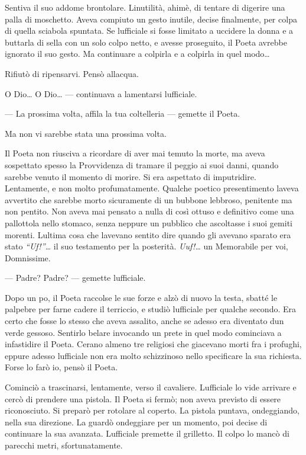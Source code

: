 Sentiva il suo addome brontolare. L\textquotesingle inutilità, ahimè, di
tentare di digerire una palla di moschetto. Aveva compiuto un gesto
inutile, decise finalmente, per colpa di quella sciabola spuntata. Se
l\textquotesingle ufficiale si fosse limitato a uccidere la donna e a
buttarla di sella con un solo colpo netto, e avesse proseguito, il Poeta
avrebbe ignorato il suo gesto. Ma continuare a colpirla e a colpirla in
quel modo\ldots{}

Rifiutò di ripensarvi. Pensò all\textquotesingle acqua.

O Dio\ldots{} O Dio\ldots{} --- continuava a lamentarsi
l\textquotesingle ufficiale.

--- La prossima volta, affila la tua coltelleria --- gemette il Poeta.

Ma non vi sarebbe stata una prossima volta.

Il Poeta non riusciva a ricordare di aver mai temuto la morte, ma aveva
sospettato spesso la Provvidenza di tramare il peggio ai suoi danni,
quando sarebbe venuto il momento di morire. Si era aspettato di
imputridire. Lentamente, e non molto profumatamente. Qualche poetico
presentimento l\textquotesingle aveva avvertito che sarebbe morto
sicuramente di un bubbone lebbroso, penitente ma non pentito. Non aveva
mai pensato a nulla di così ottuso e definitivo come una pallottola
nello stomaco, senza neppure un pubblico che ascoltasse i suoi gemiti
morenti. L\textquotesingle ultima cosa che l\textquotesingle avevano
sentito dire quando gli avevano sparato era stato \emph{``Uf!''\ldots{}}
il suo testamento per la posterità. \emph{Uuf!\ldots{}} un Memorabile
per voi, Domnissime.

--- Padre? Padre? --- gemette l\textquotesingle ufficiale.

Dopo un po\textquotesingle, il Poeta raccolse le sue forze e alzò di
nuovo la testa, sbatté le palpebre per farne cadere il terriccio, e
studiò l\textquotesingle ufficiale per qualche secondo. Era certo che
fosse lo stesso che aveva assalito, anche se adesso era diventato
d\textquotesingle un verde gessoso. Sentirlo belare invocando un prete
in quel modo cominciava a infastidire il Poeta. C\textquotesingle erano
almeno tre religiosi che giacevano morti fra i profughi, eppure adesso
l\textquotesingle ufficiale non era molto schizzinoso nello specificare
la sua richiesta. Forse lo farò io, pensò il Poeta.

Cominciò a trascinarsi, lentamente, verso il cavaliere.
L\textquotesingle ufficiale lo vide arrivare e cercò di prendere una
pistola. Il Poeta si fermò; non aveva previsto di essere riconosciuto.
Si preparò per rotolare al coperto. La pistola puntava, ondeggiando,
nella sua direzione. La guardò ondeggiare per un momento, poi decise di
continuare la sua avanzata. L\textquotesingle ufficiale premette il
grilletto. Il colpo lo mancò di parecchi metri, sfortunatamente.

